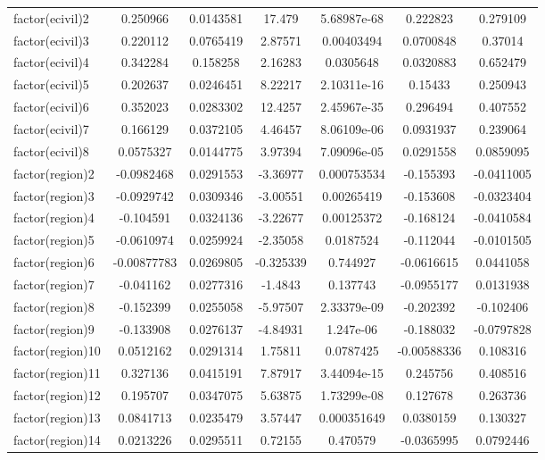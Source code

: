 \begin{landscape}
\begin{longtable}{l c c c c c c}
factor(ecivil)2 & 0.250966 & 0.0143581 &  17.479 & 5.68987e-68 & 0.222823 & 0.279109 \\
factor(ecivil)3 & 0.220112 & 0.0765419 & 2.87571 & 0.00403494 & 0.0700848 & 0.37014 \\
factor(ecivil)4 & 0.342284 & 0.158258 & 2.16283 & 0.0305648 & 0.0320883 & 0.652479 \\
factor(ecivil)5 & 0.202637 & 0.0246451 & 8.22217 & 2.10311e-16 & 0.15433 & 0.250943 \\
factor(ecivil)6 & 0.352023 & 0.0283302 & 12.4257 & 2.45967e-35 & 0.296494 & 0.407552 \\
factor(ecivil)7 & 0.166129 & 0.0372105 & 4.46457 & 8.06109e-06 & 0.0931937 & 0.239064 \\
factor(ecivil)8 & 0.0575327 & 0.0144775 & 3.97394 & 7.09096e-05 & 0.0291558 & 0.0859095 \\
factor(region)2 & -0.0982468 & 0.0291553 & -3.36977 & 0.000753534 & -0.155393 & -0.0411005 \\
factor(region)3 & -0.0929742 & 0.0309346 & -3.00551 & 0.00265419 & -0.153608 & -0.0323404 \\
factor(region)4 & -0.104591 & 0.0324136 & -3.22677 & 0.00125372 & -0.168124 & -0.0410584 \\
factor(region)5 & -0.0610974 & 0.0259924 & -2.35058 & 0.0187524 & -0.112044 & -0.0101505 \\
factor(region)6 & -0.00877783 & 0.0269805 & -0.325339 & 0.744927 & -0.0616615 & 0.0441058 \\
factor(region)7 & -0.041162 & 0.0277316 & -1.4843 & 0.137743 & -0.0955177 & 0.0131938 \\
factor(region)8 & -0.152399 & 0.0255058 & -5.97507 & 2.33379e-09 & -0.202392 & -0.102406 \\
factor(region)9 & -0.133908 & 0.0276137 & -4.84931 & 1.247e-06 & -0.188032 & -0.0797828 \\
factor(region)10 & 0.0512162 & 0.0291314 & 1.75811 & 0.0787425 & -0.00588336 & 0.108316 \\
factor(region)11 & 0.327136 & 0.0415191 & 7.87917 & 3.44094e-15 & 0.245756 & 0.408516 \\
factor(region)12 & 0.195707 & 0.0347075 & 5.63875 & 1.73299e-08 & 0.127678 & 0.263736 \\
factor(region)13 & 0.0841713 & 0.0235479 & 3.57447 & 0.000351649 & 0.0380159 & 0.130327 \\
factor(region)14 & 0.0213226 & 0.0295511 & 0.72155 & 0.470579 & -0.0365995 & 0.0792446 \\

\end{longtable}
\end{landscape}
